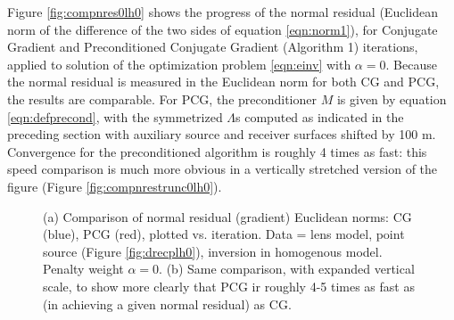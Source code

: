 \documentclass[12pt]{geophysics}
\begin{document}
Figure \ref{fig:compnres0lh0} shows the progress of the normal residual
(Euclidean norm of the difference of the two sides of equation \ref{eqn:norm1}),
for Conjugate Gradient and Preconditioned Conjugate Gradient
(Algorithm 1) iterations, applied to solution of the optimization
problem \ref{eqn:einv} with $\alpha=0$. Because the normal residual is 
measured in the Euclidean norm for both CG and PCG, the results are
comparable. For PCG, the preconditioner $M$ is given by equation
\ref{eqn:defprecond}, with the symmetrized $\Lambda$s computed as
indicated in the preceding section with auxiliary source and
receiver surfaces shifted by 100 m. Convergence for the
preconditioned algorithm is roughly 4 times as fast: this speed
comparison is much more obvious in a vertically stretched version of
the figure (Figure \ref{fig:compnrestrunc0lh0}).


\begin{figure}
  \centering
  \caption{(a) Comparison of normal residual 
  (gradient) Euclidean norms: CG (blue), PCG (red), plotted 
  vs. iteration. Data = lens model, point source (Figure 
  \ref{fig:drecplh0}), inversion in homogenous model. Penalty weight 
  $\alpha=0$. (b) Same comparison, with expanded vertical scale, to
  show more clearly that PCG ir roughly 4-5 times as fast as (in
  achieving a given normal residual) as CG.}
\end{figure}
\end{document}
